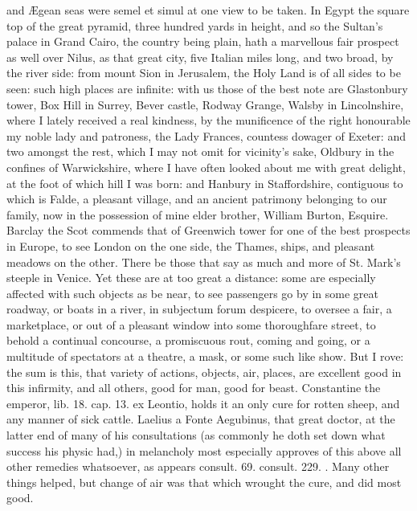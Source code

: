 {and \AE{}gean seas were semel et simul at one view to be taken. In Egypt
the square top of the great pyramid, three hundred yards in height, and
so the Sultan's palace in Grand Cairo, the country being plain, hath a
marvellous fair prospect as well over Nilus, as that great city, five
Italian miles long, and two broad, by the river side: from mount Sion
in Jerusalem, the Holy Land is of all sides to be seen: such high
places are infinite: with us those of the best note are Glastonbury
tower, Box Hill in Surrey, Bever castle, Rodway Grange, Walsby in
Lincolnshire, where I lately received a real kindness, by the
munificence of the right honourable my noble lady and patroness, the
Lady Frances, countess dowager of Exeter: and two amongst the rest,
which I may not omit for vicinity's sake, Oldbury in the confines of
Warwickshire, where I have often looked about me with great delight, at
the foot of which hill I was born: and Hanbury in Staffordshire,
contiguous to which is Falde, a pleasant village, and an ancient
patrimony belonging to our family, now in the possession of mine elder
brother, William Burton, Esquire. Barclay the Scot commends that
of Greenwich tower for one of the best prospects in Europe, to see
London on the one side, the Thames, ships, and pleasant meadows on the
other. There be those that say as much and more of St. Mark's steeple
in Venice. Yet these are at too great a distance: some are especially
affected with such objects as be near, to see passengers go by in some
great roadway, or boats in a river, in subjectum forum despicere, to
oversee a fair, a marketplace, or out of a pleasant window into some
thoroughfare street, to behold a continual concourse, a promiscuous
rout, coming and going, or a multitude of spectators at a theatre, a
mask, or some such like show. But I rove: the sum is this, that variety
of actions, objects, air, places, are excellent good in this infirmity,
and all others, good for man, good for beast. Constantine the
emperor, lib. 18. cap. 13. ex Leontio, holds it an only cure for rotten
sheep, and any manner of sick cattle. Laelius a Fonte Aegubinus, that
great doctor, at the latter end of many of his consultations (as
commonly he doth set down what success his physic had,) in melancholy
most especially approves of this above all other remedies whatsoever,
as appears consult. 69. consult. 229. \etc{}. Many other things
helped, but change of air was that which wrought the cure, and did most
good.

}
